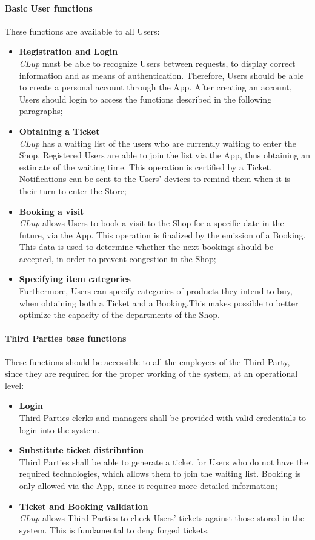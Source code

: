 \paragraph{Basic User functions} These functions are available to all Users:
\begin{itemize}
    \item \textbf{Registration and Login}\\
          \emph{CLup} must be able to recognize Users between requests, to display correct information and as means of authentication. Therefore, Users should be able to create a personal account through the App. After creating an account, Users should login to access the functions described in the following paragraphs;
    \item \textbf{Obtaining a Ticket}\\
          \emph{CLup} has a waiting list of the users who are currently waiting to enter the Shop. Registered Users are able to join the list via the App, thus obtaining an estimate of the waiting time. This operation is certified by a Ticket. Notifications can be sent to the Users' devices to remind them when it is their turn to enter the Store;
    \item \textbf{Booking a visit}\\
          \emph{CLup} allows Users to book a visit to the Shop for a specific date in the future, via the App. This operation is finalized by the emission of a Booking. This data is used to determine whether the next bookings should be accepted, in order to prevent congestion in the Shop;
    \item \textbf{Specifying item categories}\\
          Furthermore, Users can specify categories of products they intend to buy, when obtaining both a Ticket and a Booking.This makes possible to better optimize the capacity of the departments of the Shop.
\end{itemize}

\paragraph{Third Parties base functions}
These functions should be accessible to all the employees of the Third Party, since they are required for the proper working of the system, at an operational level:
\begin{itemize}
    \item\textbf{Login}\\
          Third Parties clerks and managers shall be provided with valid credentials to login into the system.
    \item\textbf{Substitute ticket distribution}\\
          Third Parties shall be able to generate a ticket for Users who do not have the required technologies, which allows them to join the waiting list. Booking is only allowed via the App, since it requires more detailed information;
    \item \textbf{Ticket and Booking validation}\\
          \emph{CLup} allows Third Parties to check Users' tickets against those stored in the system. This is fundamental to deny forged tickets.
\end{itemize}
